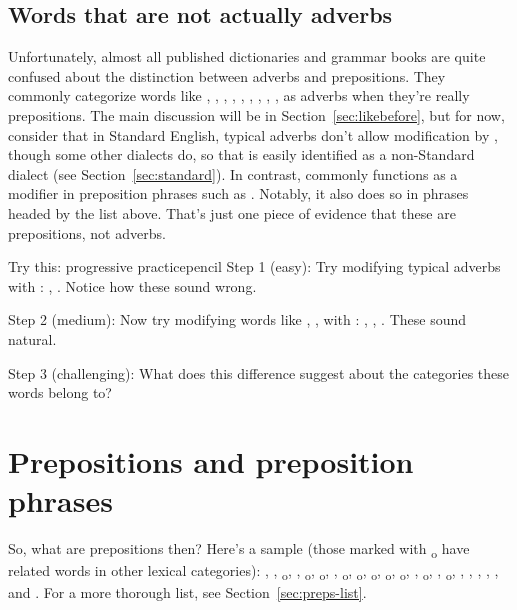 \subsection{Words that are not actually adverbs}
Unfortunately, almost all published dictionaries and grammar books are quite confused about the distinction between adverbs and prepositions. They commonly categorize words like , , , , , , , , ,  as adverbs when they're really prepositions. The main discussion will be in Section~\ref{sec:likebefore}, but for now, consider that in Standard English, typical adverbs don't allow modification by , though some other dialects do, so that  is easily identified as a non-Standard dialect (see Section~\ref{sec:standard}). In contrast,  commonly functions as a modifier in preposition phrases such as . Notably, it also does so in phrases headed by the list above. That's just one piece of evidence that these are prepositions, not adverbs.

\begin{tblsframedsymbol}{Try this: progressive practice}{pencil}
Step 1 (easy): Try modifying typical  adverbs with : , . Notice how these sound wrong.

Step 2 (medium): Now try modifying words like , ,  with : , , . These sound natural.

Step 3 (challenging): What does this difference suggest about the categories these words belong to?
\end{tblsframedsymbol}

\section{Prepositions and preposition phrases}
\label{sec:prepositions}

So, what are prepositions then? Here's a sample (those marked with \textsubscript{o} have related words in other lexical categories):
, , \textsubscript{o}, , \textsubscript{o}, \textsubscript{o}, , \textsubscript{o}, \textsubscript{o}, \textsubscript{o}, \textsubscript{o}, \textsubscript{o}, , \textsubscript{o}, , \textsubscript{o}, , , , , , and . For a more thorough list, see Section~\ref{sec:preps-list}.

